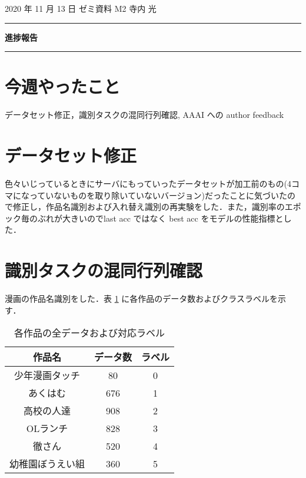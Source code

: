 \documentclass[onecolumn]{ujarticle}   %
\begin{document}
	\noindent

	\hspace{1em}
	2020 年 11 月 13 日
	ゼミ資料
	\hfill
	M2 寺内 光

	\vspace{2mm}

	\hrule

	\begin{center}
		{\Large \bf 進捗報告}
	\end{center}

	\hrule
	\vspace{3mm}

	\section{今週やったこと}
	データセット修正，識別タスクの混同行列確認, AAAI への author feedback

  \section{データセット修正}
  色々いじっているときにサーバにもっていったデータセットが加工前のもの(4コマになっていないものを取り除いていないバージョン)だったことに気づいたので修正し，作品名識別および入れ替え識別の再実験をした．また，識別率のエポック毎のぶれが大きいのでlast acc ではなく best acc をモデルの性能指標とした．

  \section{識別タスクの混同行列確認}
  漫画の作品名識別をした．表 \ref{tab:num_data} に各作品のデータ数およびクラスラベルを示す．

  \begin{table}[h]
  	\centering
  	\caption{各作品の全データおよび対応ラベル}
  	\label{tab:num_data}
  	\begin{tabular}{|c||c|c|} \hline
      作品名&データ数&ラベル \\ \hline
      少年漫画タッチ&80&0\\ \hline
      あくはむ&676&1\\ \hline
      高校の人達&908&2\\ \hline
      OLランチ&828&3\\ \hline
      徹さん&520&4\\ \hline
      幼稚園ぼうえい組&360&5\\ \hline
  	\end{tabular}
  \end{table}
\end{document}
